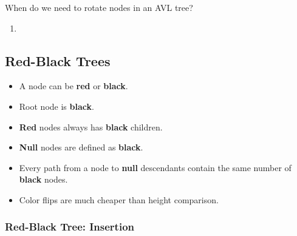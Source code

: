 \documentclass[12pt, letterpaper]{article}
\begin{document}
\begin{itemize}
\begin{itemize}
                \medskip

        \end{itemize}
\end{itemize}

\bigskip

When do we need to rotate nodes in an AVL tree?

\begin{enumerate}
    \item 
\end{enumerate}


\subsection*{Red-Black Trees}

\begin{itemize}
    \item A node can be \textbf{red} or \textbf{black}.
    \item Root node is \textbf{black}.
    \item \textbf{Red} nodes always has \textbf{black} children.
    \item \textbf{Null} nodes are defined as \textbf{black}.
    \item Every path from a node to \textbf{null} descendants contain the same number of \textbf{black} nodes.
    \item Color flips are much cheaper than height comparison.
\end{itemize}

\subsubsection*{Red-Black Tree: Insertion}
\end{document}
